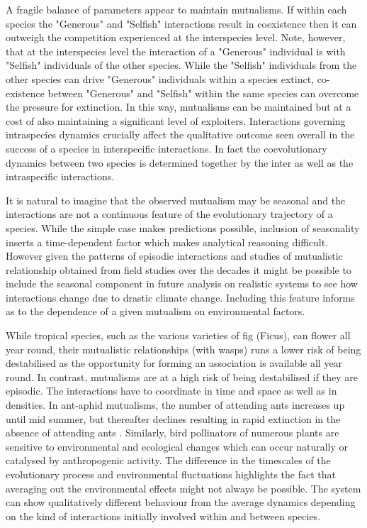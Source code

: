 \documentclass[12pt]{article}
\begin{document}
A fragile balance of parameters appear to maintain mutualisms. If within each species the "Generous" and "Selfish" interactions result in coexistence then it can outweigh the competition experienced at the interspecies level. Note, however, that at the interspecies level the interaction of a "Generous" individual is with "Selfish" individuals of the other species. While the "Selfish" individuals from the other species can drive "Generous" individuals within a species extinct, co-existence between "Generous" and "Selfish" within the same species can overcome the pressure for extinction. In this way, mutualisms can be maintained but at a cost of also maintaining a significant level of exploiters. Interactions governing intraspecies dynamics crucially affect the qualitative outcome seen overall in the success of a species in interspecific interactions. In fact the coevolutionary dynamics between two species is determined together by the inter as well as the intraspecific interactions.

It is natural to imagine that the observed mutualism may be seasonal and the interactions are not a continuous feature of the evolutionary trajectory of a species. While the simple case makes predictions possible, inclusion of seasonality inserts a time-dependent factor which makes analytical reasoning difficult. However given the patterns of episodic interactions and studies of mutualistic relationship obtained from field studies over the decades it might be possible to include the seasonal component in future analysis on realistic systems to see how interactions change due to drastic climate change. Including this feature informs as to the dependence of a given mutualism on environmental factors.

While tropical species, such as the various varieties of fig (Ficus), can flower all year round, their mutualistic relationships (with wasps) runs a lower risk of being destabilised as the opportunity for forming an association is available all year round. In contrast, mutualisms are at a high risk of being destabilised if they are episodic. The interactions have to coordinate in time and space as well as in densities.  In ant-aphid mutualisms, the number of attending ants increases up until mid summer, but thereafter declines resulting in rapid extinction in the absence of attending ants \citep{yao:Oikos:2000,yao:JIS:2009}. 
Similarly, bird pollinators of numerous plants are sensitive to environmental and ecological changes which can occur naturally or catalysed by anthropogenic activity. The difference in the timescales of the evolutionary process and environmental fluctuations highlights the fact that averaging out the environmental effects might not always be possible. The system can show qualitatively different behaviour from the average dynamics depending on the kind of interactions initially involved within and between species.
\end{document}
